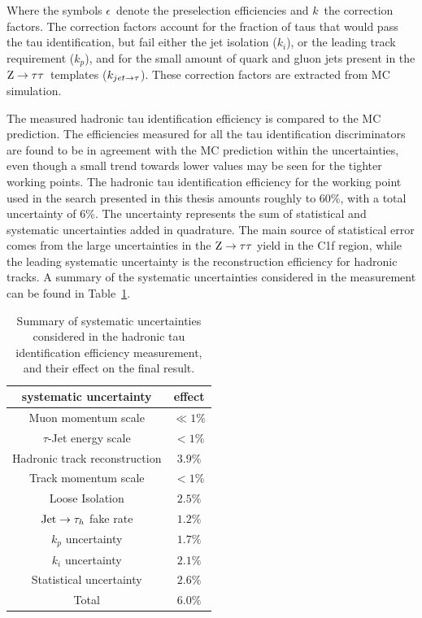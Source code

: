 Where the symbols $\epsilon$\ denote the preselection efficiencies and $k$\ the correction factors. The correction factors account for the fraction of taus that would pass the tau identification, but fail either the jet isolation ($k_i$), or the leading track requirement ($k_p$), and for the small amount of quark and gluon jets present in the $\mathrm{Z}\rightarrow\tau\tau$\ templates ($k_{jet \rightarrow \tau}$). These correction factors are extracted from MC simulation. 

The measured hadronic tau identification efficiency is compared to the MC prediction. %
The efficiencies measured for all the tau identification discriminators are found to be in agreement with the MC prediction within the uncertainties, even though a small trend towards lower values may be seen for the tighter working points. The hadronic tau identification efficiency for the working point used in the search presented in this thesis amounts roughly to 60\%, with a total uncertainty of 
6\%. The uncertainty represents the sum of statistical and systematic uncertainties added in quadrature. The main source of statistical error comes from the large uncertainties in the $\mathrm{Z}\rightarrow\tau\tau$ yield in the C1f region, while the leading systematic uncertainty is the reconstruction efficiency for hadronic tracks. A summary of the systematic uncertainties considered in the measurement can be found in Table~\ref{tab:tau_eff_sys}.

\begin{table}
\begin{center}
\caption{Summary of systematic uncertainties considered in the hadronic tau identification efficiency measurement, and their effect on the final result.}
\label{tab:tau_eff_sys}
\begin{tabular}{|c|c|}
 \hline
 systematic uncertainty & effect \\
 \hline
Muon momentum scale & $\ll 1\%$ \\
$\tau$-Jet energy scale & $ < 1\%$ \\
Hadronic track reconstruction & $3.9\%$ \\
Track momentum scale & $< 1\%$ \\
Loose Isolation & $2.5\%$ \\
$\mathrm{Jet}\rightarrow\tau_h$ fake rate & $1.2\%$ \\
$k_p$ uncertainty & $1.7\%$ \\
$k_i$ uncertainty & $2.1\%$ \\
Statistical uncertainty & $2.6\%$ \\
\hline
Total & $6.0\%$ \\
\hline
\end{tabular}
\end{center}
\end{table}


